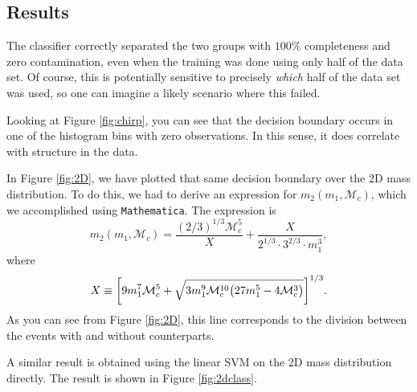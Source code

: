 \subsection{Results}
\label{sec:classifier-results}

The classifier correctly separated the two groups with $100\%$ completeness and zero contamination, even when the training was done using only half of the data set. Of course, this is potentially sensitive to precisely \emph{which} half of the data set was used, so one can imagine a likely scenario where this failed.

Looking at Figure \ref{fig:chirp}, you can see that the decision boundary occurs in one of the histogram bins with zero observations. In this sense, it does correlate with structure in the data.

In Figure \ref{fig:2D}, we have plotted that same decision boundary over the 2D mass distribution. To do this, we had to derive an expression for $m_2(m_1, \mathcal{M}_c)$, which we accomplished using \texttt{Mathematica}. The expression is
%
\begin{equation}
  m_2(m_1, \mathcal{M}_c) =
  \frac{(2/3)^{1/3} \mathcal{M}_c^5}{X} +
  \frac{X}{2^{1/3} \cdot 3^{2/3} \cdot m_1^3},
%
  \label{eq:m2-m1-Mc}
\end{equation}
%
where
%
\begin{equation}
  X \equiv
  \qty[
    9 m_1^7 \mathcal{M}_c^5 +
    \sqrt{3 m_1^9 \mathcal{M}_c^{10} \qty(27 m_1^5 - 4 \mathcal{M}_c^3)}
  ]^{1/3}.
\end{equation}
%
As you can see from Figure \ref{fig:2D}, this line corresponds to the division between the events with and without counterparts.

A similar result is obtained using the linear SVM on the 2D mass distribution directly. The result is shown in Figure \ref{fig:2dclass}.